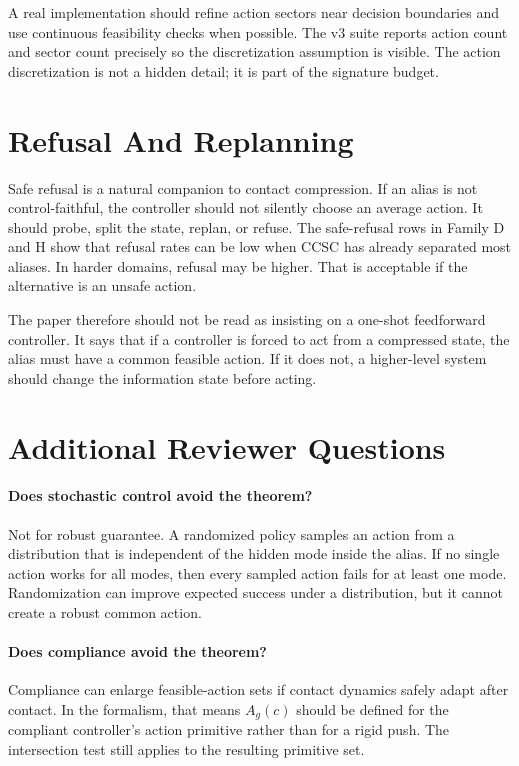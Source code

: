 \documentclass{article}
\begin{document}
A real implementation should refine action sectors near decision boundaries and use continuous feasibility checks when possible. The v3 suite reports action count and sector count precisely so the discretization assumption is visible. The action discretization is not a hidden detail; it is part of the signature budget.

\section{Refusal And Replanning}
Safe refusal is a natural companion to contact compression. If an alias is not control-faithful, the controller should not silently choose an average action. It should probe, split the state, replan, or refuse. The safe-refusal rows in Family D and H show that refusal rates can be low when CCSC has already separated most aliases. In harder domains, refusal may be higher. That is acceptable if the alternative is an unsafe action.

The paper therefore should not be read as insisting on a one-shot feedforward controller. It says that if a controller is forced to act from a compressed state, the alias must have a common feasible action. If it does not, a higher-level system should change the information state before acting.

\section{Additional Reviewer Questions}
\paragraph{Does stochastic control avoid the theorem?}
Not for robust guarantee. A randomized policy samples an action from a distribution that is independent of the hidden mode inside the alias. If no single action works for all modes, then every sampled action fails for at least one mode. Randomization can improve expected success under a distribution, but it cannot create a robust common action.

\paragraph{Does compliance avoid the theorem?}
Compliance can enlarge feasible-action sets if contact dynamics safely adapt after contact. In the formalism, that means $A_g(c)$ should be defined for the compliant controller's action primitive rather than for a rigid push. The intersection test still applies to the resulting primitive set.
\end{document}
